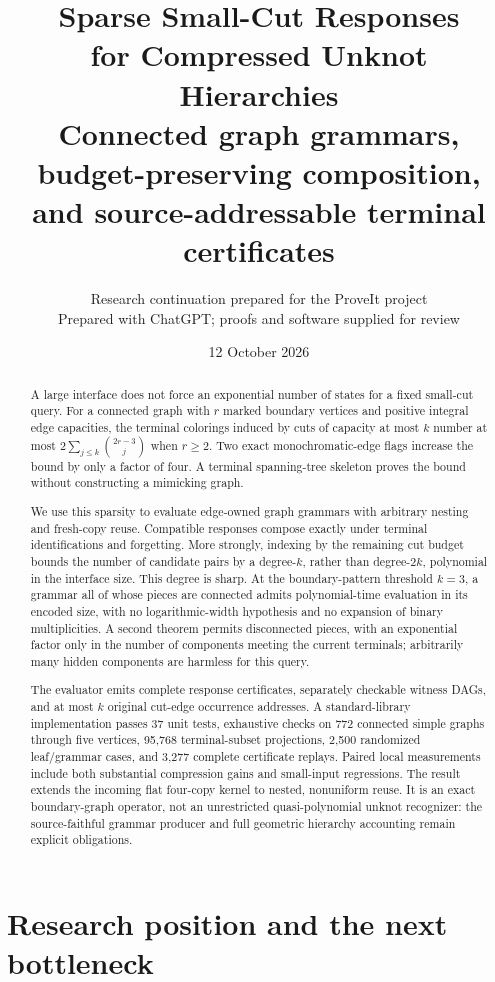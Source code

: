 \documentclass[11pt,a4paper]{article}
\title{\textbf{Sparse Small-Cut Responses\\for Compressed Unknot Hierarchies}\\[7pt]
\large Connected graph grammars, budget-preserving composition,\\and source-addressable terminal certificates}
\author{Research continuation prepared for the ProveIt project\\\small Prepared with ChatGPT; proofs and software supplied for review}
\date{12 October 2026}
\theoremstyle{definition}
\theoremstyle{remark}
\begin{document}
\maketitle
\begin{abstract}
A large interface does not force an exponential number of states for a fixed small-cut query. For a connected graph with $r$ marked boundary vertices and positive integral edge capacities, the terminal colorings induced by cuts of capacity at most $k$ number at most
$2\sum_{j\le k}\binom{2r-3}{j}$ when $r\ge2$. Two exact monochromatic-edge flags increase the bound by only a factor of four. A terminal spanning-tree skeleton proves the bound without constructing a mimicking graph.

We use this sparsity to evaluate edge-owned graph grammars with arbitrary nesting and fresh-copy reuse. Compatible responses compose exactly under terminal identifications and forgetting. More strongly, indexing by the remaining cut budget bounds the number of candidate pairs by a degree-$k$, rather than degree-$2k$, polynomial in the interface size. This degree is sharp. At the boundary-pattern threshold $k=3$, a grammar all of whose pieces are connected admits polynomial-time evaluation in its encoded size, with no logarithmic-width hypothesis and no expansion of binary multiplicities. A second theorem permits disconnected pieces, with an exponential factor only in the number of components meeting the current terminals; arbitrarily many hidden components are harmless for this query.

The evaluator emits complete response certificates, separately checkable witness DAGs, and at most $k$ original cut-edge occurrence addresses. A standard-library implementation passes 37 unit tests, exhaustive checks on 772 connected simple graphs through five vertices, 95,768 terminal-subset projections, 2,500 randomized leaf/grammar cases, and 3,277 complete certificate replays. Paired local measurements include both substantial compression gains and small-input regressions. The result extends the incoming flat four-copy kernel to nested, nonuniform reuse. It is an exact boundary-graph operator, not an unrestricted quasi-polynomial unknot recognizer: the source-faithful grammar producer and full geometric hierarchy accounting remain explicit obligations.
\end{abstract}
\thispagestyle{empty}
\clearpage
\tableofcontents
\clearpage

\section{Research position and the next bottleneck}
\label{sec:position}
\end{document}

